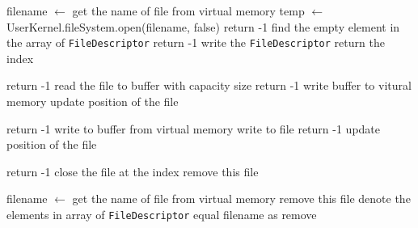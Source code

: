 \documentclass{article}
\begin{document}
\begin{algorithm}
    \begin{algorithmic}
            \State filename $\leftarrow$ get the name of file from virtual memory
            \State temp $\leftarrow$ UserKernel.fileSystem.open(filename, false)
                \State return -1
            \Else
                \State find the empty element in the array of \texttt{FileDescriptor}
                    \State return -1
                \Else
                    \State write the \texttt{FileDescriptor}
                    \State return the index
                \EndIf
            \EndIf
        \EndProcedure
    \end{algorithmic}
    \begin{algorithmic}
                \State return -1
            \EndIf
            \State read the file to buffer with capacity size
                \State return -1
            \Else
                \State write buffer to vitural memory
                \State update position of the file
            \EndIf
        \EndProcedure
    \end{algorithmic}
    \begin{algorithmic}
                \State return -1
            \EndIf
            \State write to buffer from virtual memory
            \State write to file
                \State return -1
            \Else
                \State update position of the file
            \EndIf
        \EndProcedure
    \end{algorithmic}
\end{algorithm}
\begin{algorithm}
    \begin{algorithmic}
                \State return -1
            \EndIf
            \State close the file at the index
                    \State remove this file
                \EndIf
            \EndIf
        \EndProcedure
    \end{algorithmic}
    \begin{algorithmic}
            \State filename $\leftarrow$ get the name of file from virtual memory
                \State remove this file
            \Else
                \State denote the elements in array of \texttt{FileDescriptor} equal filename as remove
            \EndIf
        \EndProcedure
    \end{algorithmic}
\end{algorithm}
\end{document}
